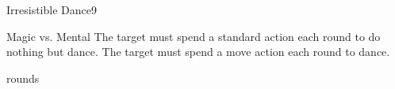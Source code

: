 \begin{spellsection}{Irresistible Dance}{9}
    \begin{spellheader}
    \end{spellheader}
    \begin{spellcontent}
        \begin{spelltargetinginfo}
        \end{spelltargetinginfo}
        \begin{spelleffects}
            \begin{spellattack}{Magic vs. Mental}
                \spellsuccess The target must spend a standard action each round to do nothing but dance.
                \spellfailure The target must spend a move action each round to dance.
            \end{spellattack}
             rounds
        \end{spelleffects}
    \end{spellcontent}
    \begin{spellfooter}
        \miscastrandom
    \end{spellfooter}
\end{spellsection}


